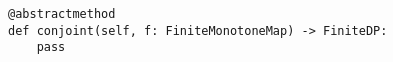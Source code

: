 \par\begin{minipage}{60ex}
\begin{verbatim}
@abstractmethod
def conjoint(self, f: FiniteMonotoneMap) -> FiniteDP:
    pass
\end{verbatim}
\end{minipage}\par